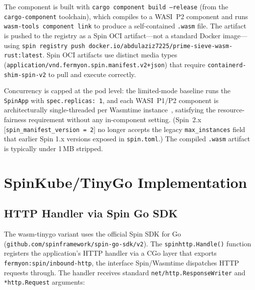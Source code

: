 \begin{sloppypar}
The component is built with \texttt{cargo component build --release} (from the \texttt{cargo-component} toolchain), which compiles to a \acs{WASI}~P2 component and runs \texttt{wasm-tools component link} to produce a self-contained \texttt{.wasm} file. The artifact is pushed to the registry as a Spin \acs{OCI} artifact---not a standard Docker image---using \texttt{spin registry push docker.io/abdulaziz7225/prime-sieve-wasm-rust:latest}. Spin \acs{OCI} artifacts use distinct media types (\texttt{application/vnd.fermyon.spin.manifest.v2+json}) that require \texttt{containerd-shim-spin-v2} to pull and execute correctly.
\end{sloppypar}

\begin{sloppypar}
Concurrency is capped at the pod level: the limited-mode baseline runs the \texttt{SpinApp} with \texttt{spec.replicas:~1}, and each \acs{WASI}~P1/P2 component is architecturally single-threaded per Wasmtime instance~\cite{clark2019standardizing, clark2023preview2, bytecodealliance2024componentmodel}, satisfying the resource-fairness requirement without any in-component setting. (Spin~2.x [\texttt{spin\_manifest\_version~=~2}] no longer accepts the legacy \texttt{max\_instances} field that earlier Spin 1.x versions exposed in \texttt{spin.toml}.) The compiled \texttt{.wasm} artifact is typically under 1\,MB stripped.
\end{sloppypar}

\section{SpinKube/TinyGo Implementation}
\label{sec:impl_spin_tinygo}

\subsection{HTTP Handler via Spin Go SDK}

\begin{sloppypar}
The wasm-tinygo variant uses the official Spin \acs{SDK} for Go (\texttt{github.com/spinframework/spin-go-sdk/v2}). The \texttt{spinhttp.Handle()} function registers the application's \acs{HTTP} handler via a \acs{CGo} layer that exports \texttt{fermyon:spin/inbound-http}, the interface Spin/Wasmtime dispatches \acs{HTTP} requests through. The handler receives standard \texttt{net/http.ResponseWriter} and \texttt{*http.Request} arguments:
\end{sloppypar}

